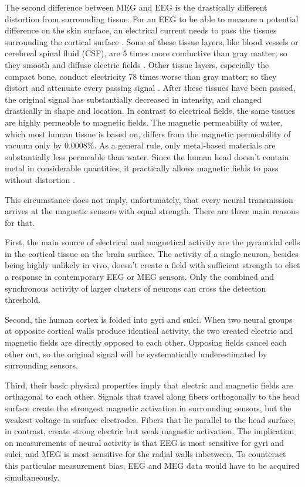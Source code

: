 The second difference between MEG and EEG is the drastically different distortion from surrounding tissue.
For an EEG to be able to measure a potential difference on the skin surface, an electrical current needs to pass the tissues surrounding the cortical surface \cite{1.5.tissues.b}.
Some of these tissue layers, like blood vessels or cerebreal spinal fluid (CSF), are 5 times more conductive than gray matter; so they smooth and diffuse electric fields \cite{1.5.tissues.a}\cite{1.5.tissues.b}.
Other tissue layers, especially the compact bone, conduct electricity 78 times worse than gray matter; so they distort and attenuate every passing signal \cite{1.5.tissues.a}.
After these tissues have been passed, the original signal has substantially decreased in intensity, and changed drastically in shape and location.
In contrast to electrical fields, the same tissues are highly permeable to magnetic fields.
The magnetic permeability of water, which most human tissue is based on, differs from the magnetic permeability of vacuum only by 0.0008\%.
As a general rule, only metal-based materials are substantially less permeable than water.
Since the human head doesn't contain metal in considerable quantities, it practically allows magnetic fields to pass without distortion \cite{1.5.tissues.a}.

This circumstance does not imply, unfortunately, that every neural transmission arrives at the magnetic sensors with equal strength.
There are three main reasons for that.

First, the main source of electrical and magnetical activity are the pyramidal cells in the cortical tissue on the brain surface.
The activity of a single neuron, besides being highly unlikely in vivo, doesn't create a field with sufficient strength to elict a response in contemporary EEG or MEG sensors.
Only the combined and synchronous activity of larger clusters of neurons can cross the detection threshold.

Second, the human cortex is folded into gyri and sulci.
When two neural groups at opposite cortical walls produce identical activity, the two created electric and magnetic fields are directly opposed to each other.
Opposing fields cancel each other out, so the original signal will be systematically underestimated by surrounding sensors.

Third, their basic physical properties imply that electric and magnetic fields are orthagonal to each other.
Signals that travel along fibers orthogonally to the head surface create the strongest magnetic activation in surrounding sensors, but the weakest voltage in surface electrodes.
Fibers that lie parallel to the head surface, in contrast, create strong electric but weak magnetic activation.
The implication on measurements of neural activity is that EEG is most sensitive for gyri and sulci, and MEG is most sensitive for the radial walls inbetween.
To counteract this particular measurement bias, EEG and MEG data would have to be acquired simultaneously.

